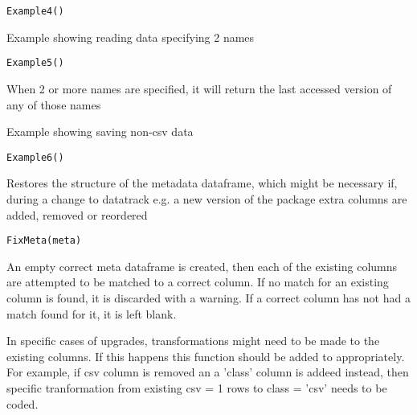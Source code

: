 \documentclass[a4paper]{book}
\begin{document}
%
\begin{Usage}
\begin{verbatim}
Example4()
\end{verbatim}
\end{Usage}
%
\begin{Description}\relax
Example showing reading data specifying 2 names
\end{Description}
%
\begin{Usage}
\begin{verbatim}
Example5()
\end{verbatim}
\end{Usage}
%
\begin{Details}\relax
When 2 or more names are specified, it will return the last accessed version of any of those names
\end{Details}
%
\begin{Description}\relax
Example showing saving non-csv data
\end{Description}
%
\begin{Usage}
\begin{verbatim}
Example6()
\end{verbatim}
\end{Usage}
%
\begin{Description}\relax
Restores the structure of the metadata dataframe, which might be
necessary if, during a change to datatrack e.g. a new version of the package
extra columns are added, removed or reordered
\end{Description}
%
\begin{Usage}
\begin{verbatim}
FixMeta(meta)
\end{verbatim}
\end{Usage}
%
\begin{Details}\relax
An empty correct meta dataframe is created, then each of the existing
columns are attempted to be matched to a correct column. If no match for an existing
column is found, it is discarded with a warning. If a correct column has not had a match found
for it, it is left blank.

In specific cases of upgrades, transformations might need to be made to the existing columns. If this
happens this function should be added to appropriately. For example, if csv column is removed an a 'class' column
is addeed instead, then specific tranformation from existing csv = 1 rows to class = 'csv' needs to be coded.
\end{Details}
\end{document}
